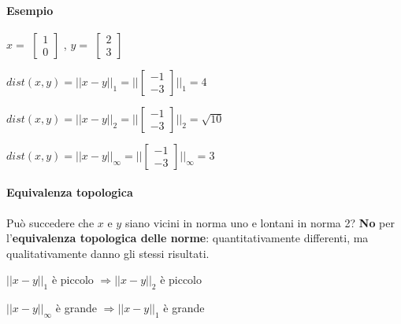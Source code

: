 \documentclass[10pt]{book}
\begin{document}
\paragraph{Esempio} $x = $
\begin{math}
	\left[
	\begin{array}{c}
		1\\0
	\end{array}
	\right]
\end{math}
, $y = $
\begin{math}
	\left[
	\begin{array}{c}
		2\\3
	\end{array}
	\right]
\end{math}
\begin{list}{}{}
	\item $dist(x, y) = ||x - y||_1 = ||$\begin{math}
	\left[
	\begin{array}{c}
		-1\\-3
	\end{array}
	\right]
	||_1 = 4
\end{math}
	\item $dist(x, y) = ||x - y||_2 = ||$\begin{math}
	\left[
	\begin{array}{c}
		-1\\-3
	\end{array}
	\right]
	||_2 = \sqrt{10}
\end{math}
	\item $dist(x, y) = ||x - y||_\infty = ||$\begin{math}
	\left[
	\begin{array}{c}
		-1\\-3
	\end{array}
	\right]
	||_\infty = 3
\end{math}
\end{list}
\paragraph{Equivalenza topologica} Può succedere che $x$ e $y$ siano vicini in norma uno e lontani in norma 2? \textbf{No} per l'\textbf{equivalenza topologica delle norme}: quantitativamente differenti, ma qualitativamente danno gli stessi risultati.
\begin{list}{}{}
	\item $||x - y||_1$ è piccolo $\Rightarrow ||x - y||_2$ è piccolo
	\item $||x - y||_\infty$ è grande $\Rightarrow ||x - y||_1$ è grande
\end{list}
\pagebreak
\end{document}
